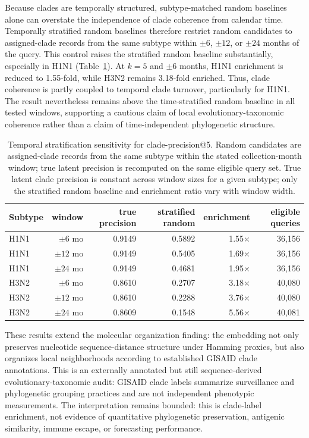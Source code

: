 \documentclass[11pt]{article}
\begin{document}
Because clades are temporally structured, subtype-matched random baselines alone can overstate the independence of clade coherence from calendar time. Temporally stratified random baselines therefore restrict random candidates to assigned-clade records from the same subtype within $\pm 6$, $\pm 12$, or $\pm 24$ months of the query. This control raises the stratified random baseline substantially, especially in H1N1 (Table~\ref{tab:clade-temporal-stratified}). At $k=5$ and $\pm 6$ months, H1N1 enrichment is reduced to 1.55-fold, while H3N2 remains 3.18-fold enriched. Thus, clade coherence is partly coupled to temporal clade turnover, particularly for H1N1. The result nevertheless remains above the time-stratified random baseline in all tested windows, supporting a cautious claim of local evolutionary-taxonomic coherence rather than a claim of time-independent phylogenetic structure.

\begin{table}[H]
\centering
\caption{Temporal stratification sensitivity for clade-precision@5. Random candidates are assigned-clade records from the same subtype within the stated collection-month window; true latent precision is recomputed on the same eligible query set. True latent clade precision is constant across window sizes for a given subtype; only the stratified random baseline and enrichment ratio vary with window width.}
\label{tab:clade-temporal-stratified}
\begin{tabular}{lrrrrr}
\toprule
Subtype & window & true precision & stratified random & enrichment & eligible queries \\
\midrule
H1N1 & $\pm 6$ mo & 0.9149 & 0.5892 & 1.55$\times$ & 36,156 \\
H1N1 & $\pm 12$ mo & 0.9149 & 0.5405 & 1.69$\times$ & 36,156 \\
H1N1 & $\pm 24$ mo & 0.9149 & 0.4681 & 1.95$\times$ & 36,156 \\
H3N2 & $\pm 6$ mo & 0.8610 & 0.2707 & 3.18$\times$ & 40,080 \\
H3N2 & $\pm 12$ mo & 0.8610 & 0.2288 & 3.76$\times$ & 40,080 \\
H3N2 & $\pm 24$ mo & 0.8609 & 0.1548 & 5.56$\times$ & 40,081 \\
\bottomrule
\end{tabular}
\end{table}

These results extend the molecular organization finding: the embedding not only preserves nucleotide sequence-distance structure under Hamming proxies, but also organizes local neighborhoods according to established GISAID clade annotations. This is an externally annotated but still sequence-derived evolutionary-taxonomic audit: GISAID clade labels summarize surveillance and phylogenetic grouping practices and are not independent phenotypic measurements. The interpretation remains bounded: this is clade-label enrichment, not evidence of quantitative phylogenetic preservation, antigenic similarity, immune escape, or forecasting performance.
\end{document}
